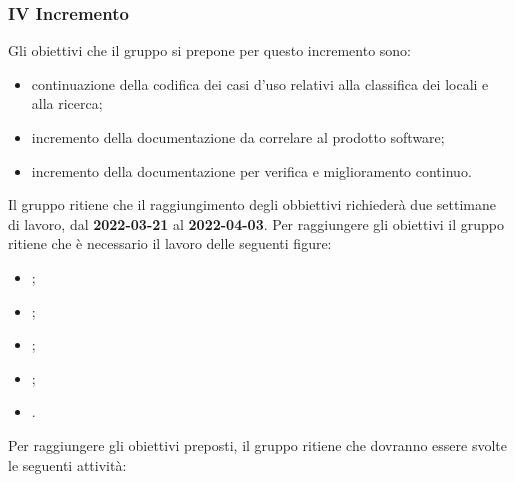 \subsubsection{IV Incremento}
Gli obiettivi che il gruppo si prepone per questo incremento sono:
\begin{itemize}
	\item continuazione della codifica dei casi d'uso relativi alla classifica dei locali e alla ricerca;
 	\item incremento della documentazione da correlare al prodotto software;
	\item incremento della documentazione per verifica e miglioramento continuo.
\end{itemize}
Il gruppo ritiene che il raggiungimento degli obbiettivi richiederà due settimane di lavoro, dal \textbf{2022-03-21} al \textbf{2022-04-03}.
Per raggiungere gli obiettivi il gruppo ritiene che è necessario il lavoro delle seguenti figure:
\begin{itemize}
	\item \RE{};
 	\item \AM{};
   	\item \PT{};
    \item \PR{};
   	\item \VE{}.
\end{itemize}
Per raggiungere gli obiettivi preposti, il gruppo ritiene che dovranno essere svolte le seguenti attività:
